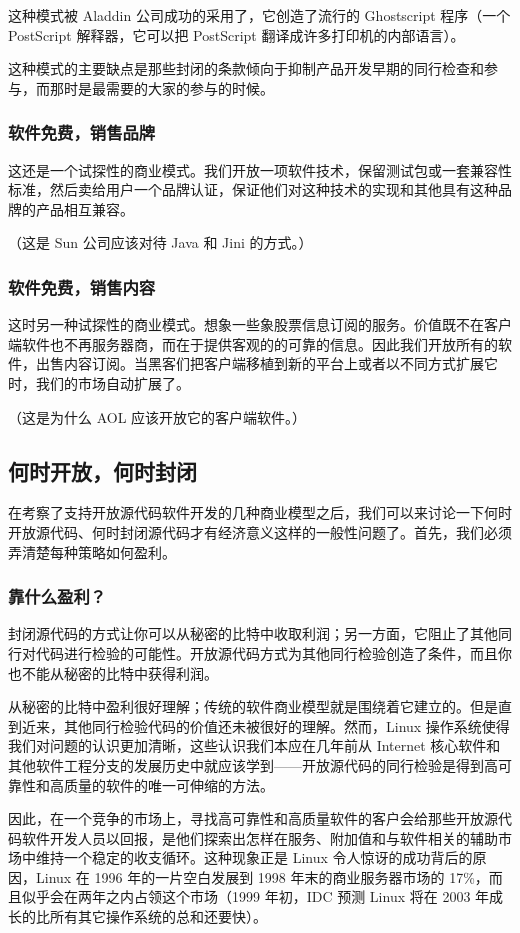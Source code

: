 这种模式被 Aladdin 公司成功的采用了，它创造了流行的 Ghostscript 程序（一个 PostScript 解释器，它可以把 PostScript 翻译成许多打印机的内部语言）。


这种模式的主要缺点是那些封闭的条款倾向于抑制产品开发早期的同行检查和参与，而那时是最需要的大家的参与的时候。

\subsubsection{软件免费，销售品牌}
这还是一个试探性的商业模式。我们开放一项软件技术，保留测试包或一套兼容性标准，然后卖给用户一个品牌认证，保证他们对这种技术的实现和其他具有这种品牌的产品相互兼容。


（这是 Sun 公司应该对待 Java 和 Jini 的方式。）

\subsubsection{软件免费，销售内容}
这时另一种试探性的商业模式。想象一些象股票信息订阅的服务。价值既不在客户端软件也不再服务器商，而在于提供客观的的可靠的信息。因此我们开放所有的软件，出售内容订阅。当黑客们把客户端移植到新的平台上或者以不同方式扩展它时，我们的市场自动扩展了。


（这是为什么 AOL 应该开放它的客户端软件。）


\subsection{何时开放，何时封闭}
在考察了支持开放源代码软件开发的几种商业模型之后，我们可以来讨论一下何时开放源代码、何时封闭源代码才有经济意义这样的一般性问题了。首先，我们必须弄清楚每种策略如何盈利。

\subsubsection{靠什么盈利？}
封闭源代码的方式让你可以从秘密的比特中收取利润；另一方面，它阻止了其他同行对代码进行检验的可能性。开放源代码方式为其他同行检验创造了条件，而且你也不能从秘密的比特中获得利润。


从秘密的比特中盈利很好理解；传统的软件商业模型就是围绕着它建立的。但是直到近来，其他同行检验代码的价值还未被很好的理解。然而，Linux 操作系统使得我们对问题的认识更加清晰，这些认识我们本应在几年前从 Internet 核心软件和其他软件工程分支的发展历史中就应该学到——开放源代码的同行检验是得到高可靠性和高质量的软件的唯一可伸缩的方法。


因此，在一个竞争的市场上，寻找高可靠性和高质量软件的客户会给那些开放源代码软件开发人员以回报，是他们探索出怎样在服务、附加值和与软件相关的辅助市场中维持一个稳定的收支循环。这种现象正是 Linux 令人惊讶的成功背后的原因，Linux 在 1996 年的一片空白发展到 1998 年末的商业服务器市场的 17\%，而且似乎会在两年之内占领这个市场（1999 年初，IDC 预测 Linux 将在 2003 年成长的比所有其它操作系统的总和还要快）。


